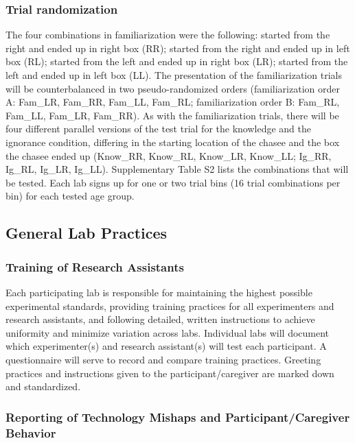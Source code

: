 \documentclass[
  man, donotrepeattitle,floatsintext]{apa6}
\begin{document}
\subsubsection{Trial randomization}\label{trial-randomization}

The four combinations in familiarization were the following: started from the right and ended up in right box (RR); started from the right and ended up in left box (RL); started from the left and ended up in right box (LR); started from the left and ended up in left box (LL). The presentation of the familiarization trials will be counterbalanced in two pseudo-randomized orders (familiarization order A: Fam\_LR, Fam\_RR, Fam\_LL, Fam\_RL; familiarization order B: Fam\_RL, Fam\_LL, Fam\_LR, Fam\_RR). As with the familiarization trials, there will be four different parallel versions of the test trial for the knowledge and the ignorance condition, differing in the starting location of the chasee and the box the chasee ended up (Know\_RR, Know\_RL, Know\_LR, Know\_LL; Ig\_RR, Ig\_RL, Ig\_LR, Ig\_LL). Supplementary Table S2 lists the combinations that will be tested. Each lab signs up for one or two trial bins (16 trial combinations per bin) for each tested age group.

\subsection{General Lab Practices}\label{general-lab-practices}

\subsubsection{Training of Research Assistants}\label{training-of-research-assistants}

Each participating lab is responsible for maintaining the highest possible experimental standards, providing training practices for all experimenters and research assistants, and following detailed, written instructions to achieve uniformity and minimize variation across labs. Individual labs will document which experimenter(s) and research assistant(s) will test each participant. A questionnaire will serve to record and compare training practices. Greeting practices and instructions given to the participant/caregiver are marked down and standardized.

\subsubsection{Reporting of Technology Mishaps and Participant/Caregiver Behavior}\label{reporting-of-technology-mishaps-and-participantcaregiver-behavior}
\end{document}

